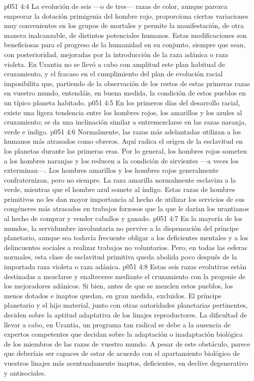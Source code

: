 \vs p051 4:4 La evolución de seis ---o de tres--- razas de color, aunque parezca empeorar la dotación primigenia del hombre rojo, proporciona ciertas variaciones muy convenientes en los grupos de mortales y permite la manifestación, de otra manera inalcanzable, de distintos potenciales humanos. Estas modificaciones son beneficiosas para el progreso de la humanidad en su conjunto, siempre que sean, con posterioridad, mejoradas por la introducción de la raza adánica o raza violeta. En Urantia no se llevó a cabo con amplitud este plan habitual de cruzamiento, y el fracaso en el cumplimiento del plan de evolución racial imposibilita que, partiendo de la observación de los restos de estas primeras razas en vuestro mundo, entendáis, en buena medida, la condición de estos pueblos en un típico planeta habitado.
\vs p051 4:5 \pc En los primeros días del desarrollo racial, existe una ligera tendencia entre los hombres rojos, los amarillos y los azules al cruzamiento; se da una inclinación similar a entremezclarse en las razas naranja, verde e índigo.
\vs p051 4:6 Normalmente, las razas más adelantadas utilizan a los humanos más atrasados como obreros. Aquí radica el origen de la esclavitud en los planetas durante las primeras eras. Por lo general, los hombres rojos someten a los hombres naranjas y los reducen a la condición de sirvientes ---a veces los exterminan---. Los hombres amarillos y los hombres rojos generalmente confraternizan, pero no siempre. La raza amarilla normalmente esclaviza a la verde, mientras que el hombre azul somete al índigo. Estas razas de hombres primitivos no les dan mayor importancia al hecho de utilizar los servicios de sus congéneres más atrasados en trabajos forzosos que la que le darían los urantianos al hecho de comprar y vender caballos y ganado.
\vs p051 4:7 En la mayoría de los mundos, la servidumbre involuntaria no pervive a la dispensación del príncipe planetario, aunque sea todavía frecuente obligar a los deficientes mentales y a los delincuentes sociales a realizar trabajos no voluntarios. Pero, en todas las esferas normales, esta clase de esclavitud primitiva queda abolida poco después de la importada raza violeta o raza adánica.
\vs p051 4:8 Estas seis razas evolutivas están destinadas a mezclarse y enaltecerse mediante el cruzamiento con la progenie de los mejoradores adánicos. Si bien, antes de que se mezclen estos pueblos, los menos dotados e inaptos quedan, en gran medida, excluidos. El príncipe planetario y el hijo material, junto con otras autoridades planetarias pertinentes, deciden sobre la aptitud adaptativa de los linajes reproductores. La dificultad de llevar a cabo, en Urantia, un programa tan radical se debe a la ausencia de expertos competentes que decidan sobre la adaptación o inadaptación biológica de los miembros de las razas de vuestro mundo. A pesar de este obstáculo, parece que deberíais ser capaces de estar de acuerdo con el apartamiento biológico de vuestros linajes más acentuadamente inaptos, deficientes, en declive degenerativo y antisociales.
